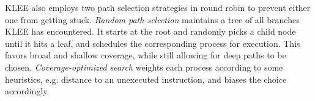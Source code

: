 %
KLEE also employs two path selection strategies in round robin to
prevent either one from getting stuck.
%
\emph{Random path selection} maintains a tree of all branches KLEE has
encountered.
%
It starts at the root and randomly picks a child node until it hits a
leaf, and schedules the corresponding process for execution.
%
This favors broad and shallow coverage, while still allowing for deep
paths to be chosen.
%
\emph{Coverage-optimized search} weights each process according to some
heuristics, e.g. distance to an unexecuted instruction, and biases the
choice accordingly.
%
